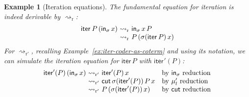 \documentclass[10pt,a4paper]{amsart}
\theoremstyle{plain}
\newtheorem{example}[example]{Example}
\theoremstyle{definition}
\newcommand{\anupam}[1]{\todo[color=green]{A: #1}}
\renewcommand{\todo}[1]{}
\renewcommand{\anupam}[1]{}
\theoremstyle{plain}
\theoremstyle{definition} %
\newcommand{\arrow}{\to}
\newcommand{\seqar}{\Rightarrow}
\newcommand{\mulunf}{\lr \mu'}
\newcommand{\iter}[1]{\mathsf{iter}_{#1}}
\newcommand{\inj}{\mathsf{in}}
\newcommand{\injX}[1]{\inj_{#1}}
\newcommand{\id}{\mathsf{id}}
\newcommand{\cut}{\mathsf{cut}}
\newcommand{\lr}[1]{#1_l}
\newcommand{\rewrite}{\rightsquigarrow}
\newcommand{\cutreduction}{\mathrm{cr}}
\newcommand{\cutred}{\rewrite_{\cutreduction}}
\newcommand{\cutreductionnorec}{\mathrm{cr}'}
\newcommand{\cutrednorec}{\rewrite_{\cutreductionnorec}}
\newcommand{\reduction}{\mathrm{r}}
\newcommand{\reduces}{\rewrite_{\reduction}}
\newcommand{\reductionnorec}{\mathrm{r}'}
\newcommand{\reducesnorec}{\rewrite_{\reductionnorec}}
\begin{document}
\begin{example}
[Iteration equations]
The fundamental equation for iteration is indeed derivable by $\reduces$:
\[
\begin{array}{r@{\ \reduces\ }l}
     \iter{}\, P\, (\injX\sigma\, x) & \injX \sigma \, x\, P  \\
     & P\, (\sigma(\iter\, P)\, x)
\end{array}
\]
For $\reducesnorec$, recalling Example~\ref{ex:iter-coder-as-coterm} and using its notation,
we can simulate the iteration equation for $\iter\, P$ with $\iter{}'(P)$:
\[
\begin{array}{r@{\ \reducesnorec\ }ll}
     \iter{}'(P)\, (\injX\sigma\, x) & \iter{}'(P)\, x & \text{by $\injX\sigma$ reduction} \\
     & \cut\, \sigma(\iter{}'(P))\, P\, x & \text{by $\mulunf$ reduction} \\
     & P\, (\sigma(\iter{}'(P))\, x) & \text{by $\cut$ reduction}
\end{array}
\]
\anupam{point out that, at this juncture, $\reduces$ and $\reducesnorec$ do not agree/are not compatible, unlike $\cutred^* \subseteq \cutrednorec^*$? check this.}
\end{example}

\todo{need to mention clashing reductions and problem of confluence. we address this shortle by giving an interpretation in lambda terms.}
\end{document}
